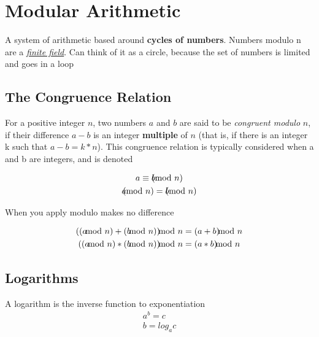 \documentclass{article}
\newcommand{\worddef}[1]{\hyperref[sec:reference]{\textit{#1}}}
\begin{document}
\section{Modular Arithmetic}
\begin{flushleft}
A system of arithmetic based around \textbf{cycles of numbers}. Numbers modulo n are a \worddef{finite field}. Can think of it as a circle, because the set of numbers is limited and goes in a loop
\end{flushleft}

\subsection{The Congruence Relation}

\begin{flushleft}
For a positive integer $n$, two numbers $a$ and $b$ are said to be \textit{congruent modulo} $n$, if their difference $a − b$ is an integer \textbf{multiple} of $n$ (that is, if there is an integer k such that $a − b = k*n$). This congruence relation is typically considered when a and b are integers, and is denoted
\end{flushleft} 
\begin{gather}
  a\equiv b \kern-0.3cm \pmod{n} \\
  a \kern-0.3cm \pmod{n} = b \kern-0.3cm \pmod{n}
\end{gather}

\begin{flushleft}
When you apply modulo makes no difference
\end{flushleft}
\begin{gather}
  ((a \kern-0.3cm \mod{n}) + (b \kern-0.3cm \mod{n})) \kern-0.3cm \mod{n} = (a + b) \kern-0.3cm \mod{n} \\
   ((a \kern-0.3cm \mod{n}) * (b \kern-0.3cm \mod{n})) \kern-0.3cm \mod{n} = (a * b) \kern-0.3cm \mod{n}
\end{gather}

\pagebreak

\subsection{Logarithms}
\begin{flushleft}
A logarithm is the inverse function to exponentiation
\begin{gather}
   a^{b} = c \\
   b = log_a c
\end{gather}
\end{flushleft}
\end{document}
